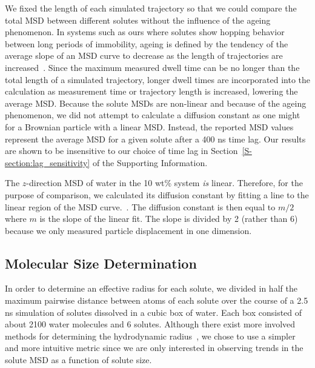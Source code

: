 \documentclass[journal=jpcbfk,manuscript=article]{achemso}
\begin{document}
  We fixed the length of each simulated trajectory so that we could compare the total
  MSD between different solutes without the influence of the ageing phenomenon.
  In systems such as ours where solutes show hopping behavior between long periods 
  of immobility, ageing is defined by the tendency of the average slope of an MSD 
  curve to decrease as the length of trajectories are increased~\cite{metzler_anomalous_2014}.
  Since the maximum measured dwell time can be no longer than the total length of a simulated
  trajectory, longer dwell times are incorporated into the calculation as measurement
  time or trajectory length is increased, lowering the average MSD. Because the solute 
  MSDs are non-linear and because of the ageing phenomenon, we did not attempt to calculate
  a diffusion constant as one might for a Brownian particle with a linear MSD. Instead,
  the reported MSD values represent the average MSD for a given	solute after a 400
  ns time lag. Our results are shown to be insensitive to our choice of time lag in 
  Section~\ref{S-section:lag_sensitivity} of the Supporting Information.
  
  The $z$-direction MSD of water in the 10 wt\% system \textit{is} linear. Therefore, for
  the purpose of comparison, we calculated its diffusion constant by fitting a line
  to the linear region of the MSD curve.~\cite{maginn_best_2018}. The diffusion constant
  is then equal to $m/2$ where $m$ is the slope of the linear fit. The slope is divided
  by 2 (rather than 6) because we only measured particle displacement in one dimension.

  \subsection{Molecular Size Determination}\label{method:molecular_size}
  
  In order to determine an effective radius for each solute, we divided in 
  half the maximum pairwise distance between atoms of each solute over the course of
  a 2.5 ns simulation of solutes dissolved in a cubic box of water. Each box 
  consisted of about 2100 water molecules and 6 solutes. Although there exist
  more involved methods for determining the hydrodynamic radius~\cite{schultz_determination_1961},
  we chose to use a simpler and more intuitive metric since we are only interested
  in observing trends in the solute MSD as a function
  of solute size.
  
\end{document}
